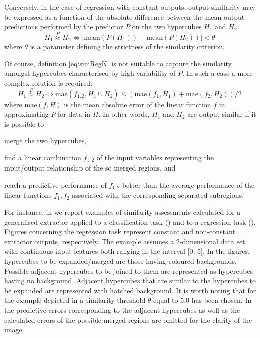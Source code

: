 \documentclass[
]{ceurart}
\begin{document}
Conversely, in the case of regression with constant outputs, output-similarity may be expressed as a function of the absolute difference between the mean output predictions performed by the predictor $P$ on the two hypercubes $H_1$ and $H_2$:
%
\begin{equation}\label{eq:simRegK}
	H_1 \stackrel{P}{\approx} H_2 \Leftrightarrow |\text{mean}(P(H_1)) - \text{mean}(P(H_2))| < \theta\,
\end{equation}
%
where $\theta$ is a parameter defining the strictness of the similarity criterion.

Of course, definition \ref{eq:simRegK} is not suitable to capture the similarity amongst hypercubes characterised by high variability of $P$.
%
In such a case a more complex solution is required:
%
\begin{equation}\label{eq:simRegLin}
	H_1 \stackrel{P}{\approx} H_2 \Leftrightarrow \text{mae}(f_{1,2}, H_1 \cup H_2) \leq (\text{mae}(f_1, H_1) + \text{mae}(f_2, H_2)) / 2 \,
\end{equation}
%
where $\text{mae}(f, H)$ is the mean absolute error of the linear function $f$ in approximating 
$P$ for data in $H$.
%
In other words, $H_1$ and $H_2$ are output-similar if it is possible to
%
\begin{inlinelist}
	\item merge the two hypercubes, %
	\item find a linear combination $f_{1,2}$ of the input variables representing the input/output relationship of the so merged regions, and
	\item reach a predictive performance of $f_{1,2}$ better than the average performance of the linear functions $f_1, f_2$ associated with the corresponding separated subregions.
\end{inlinelist}



For instance, in  we report examples of similarity assessments calculated for a generalised extractor applied to a classification task () and to a regression task ().
%
Figures concerning the regression task represent constant and non-constant extractor outputs, respectively.
%
The example assumes a 2-dimensional data set with continuous input features both ranging in the interval [0, 5].
%
In the figures, hypercubes to be expanded/merged are those having coloured backgrounds.
%
Possible adjacent hypercubes to be joined to them are represented as hypercubes having no background.
%
Adjacent hypercubes that are similar to the hypercubes to be expanded are represented with hatched background.
%
It is worth noting that for the example depicted in  a similarity threshold $\theta$ equal to 5.0 has been chosen.
%
In  the predictive errors corresponding to the adjacent hypercubes as well as the calculated errors of the possible merged regions are omitted for the clarity of the image.
\end{document}
